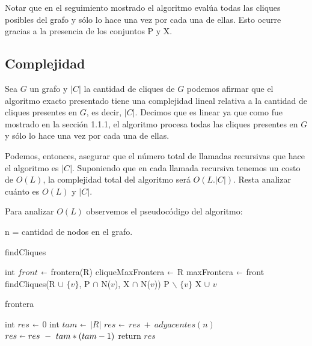 Notar que en el seguimiento mostrado el algoritmo evalúa todas las cliques posibles del grafo y sólo lo hace una vez por cada una de ellas. Esto ocurre gracias a la presencia de los conjuntos P y X.

\subsection{Complejidad}

Sea $G$ un grafo y $|C|$ la cantidad de cliques de $G$ podemos afirmar que el algoritmo exacto presentado tiene una complejidad lineal relativa a la cantidad de cliques presentes en $G$, es decir, $|C|$. Decimos que es linear ya que como fue mostrado en la sección 1.1.1, el algoritmo procesa todas las cliques presentes en $G$ y sólo lo hace una vez por cada una de ellas.

Podemos, entonces, asegurar que el número total de llamadas recursivas que hace el algoritmo es $|C|$. Suponiendo que en cada llamada recursiva tenemos un costo de $O(L)$, la complejidad total del algoritmo será $O(L.|C|)$. Resta analizar cuánto es $O(L)$ y $|C|$.

Para analizar $O(L)$ observemos el pseudocódigo del algoritmo:

n = cantidad de nodos en el grafo.

\begin{algorithm}[H]
\caption{findCliques}\label{ej1}
\begin{algorithmic}[1]
	\State int $front$ $\shortleftarrow$ frontera(R) 
		\State cliqueMaxFrontera $\shortleftarrow$ R 
		\State maxFrontera $\shortleftarrow$ front 
	\EndIf
		\State findCliques(R $\cup$ $\{v\}$, P $\cap$ N($v$), X $\cap$ N($v$))  
		\State P $\backslash$ $\{v\}$ 
		\State X $\cup$ $v$ 
	\EndFor
\EndProcedure
\end{algorithmic}
\end{algorithm}

\begin{algorithm}[H]
\caption{frontera}\label{ej1}
\begin{algorithmic}[1]
	\State int $res$ $\shortleftarrow$ 0 
	\State int $tam$ $\shortleftarrow$ $|R|$ 
	 
		\State $res$ $\shortleftarrow$ $res \ + \ adyacentes(n)$ 
	\EndFor
	\State $res \shortleftarrow res \ - \ tam*(tam-1)$ 
	\State return $res$ 
\EndProcedure
\end{algorithmic}
\end{algorithm}

